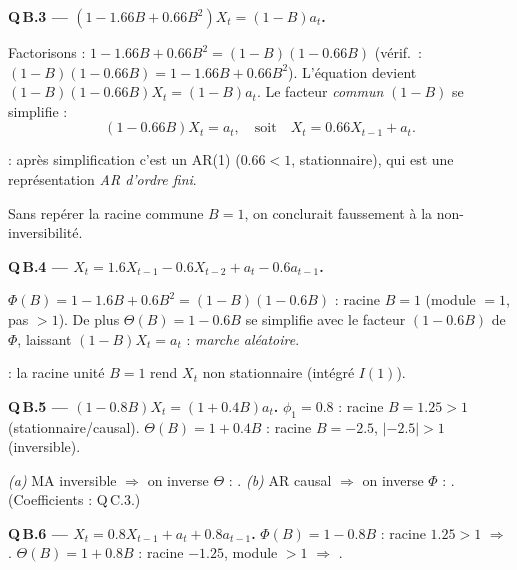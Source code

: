 \documentclass[11pt]{article}
\begin{document}
\textbf{Q\,B.3 --- $(1-1.66B+0.66B^2)X_t=(1-B)a_t$.}
\begin{etapes}
Factorisons : $1-1.66B+0.66B^2=(1-B)(1-0.66B)$ (vérif.\ : $(1-B)(1-0.66B)=1-1.66B+0.66B^2$).
L'équation devient $(1-B)(1-0.66B)X_t=(1-B)a_t$. Le facteur \emph{commun} $(1-B)$ se simplifie :
\[
(1-0.66B)X_t=a_t,\quad\text{soit}\quad X_t=0.66X_{t-1}+a_t.
\]
\end{etapes}
\begin{reponse} : après simplification c'est un AR(1) ($0.66<1$, stationnaire),
qui est une représentation \emph{AR d'ordre fini}.\end{reponse}
\begin{attention}Sans repérer la racine commune $B=1$, on conclurait faussement à la
non-inversibilité.\end{attention}

\textbf{Q\,B.4 --- $X_t=1.6X_{t-1}-0.6X_{t-2}+a_t-0.6a_{t-1}$.}
\begin{etapes}
$\Phi(B)=1-1.6B+0.6B^2=(1-B)(1-0.6B)$ : racine $B=1$ (module $=1$, pas $>1$). De plus
$\Theta(B)=1-0.6B$ se simplifie avec le facteur $(1-0.6B)$ de $\Phi$, laissant
$(1-B)X_t=a_t$ : \emph{marche aléatoire}.
\end{etapes}
\begin{reponse} : la racine unité $B=1$ rend $X_t$ non stationnaire (intégré
$I(1)$).\end{reponse}

\textbf{Q\,B.5 --- $(1-0.8B)X_t=(1+0.4B)a_t$.}
$\phi_1=0.8$ : racine $B=1.25>1$ (stationnaire/causal). $\Theta(B)=1+0.4B$ : racine
$B=-2.5$, $|{-2.5}|>1$ (inversible).
\begin{reponse}
\emph{(a)} MA inversible $\Rightarrow$ on inverse $\Theta$ : .
\emph{(b)} AR causal $\Rightarrow$ on inverse $\Phi$ : . (Coefficients : Q\,C.3.)
\end{reponse}

\textbf{Q\,B.6 --- $X_t=0.8X_{t-1}+a_t+0.8a_{t-1}$.}
$\Phi(B)=1-0.8B$ : racine $1.25>1$ $\Rightarrow$ . $\Theta(B)=1+0.8B$ :
racine $-1.25$, module $>1$ $\Rightarrow$ .
\end{document}
